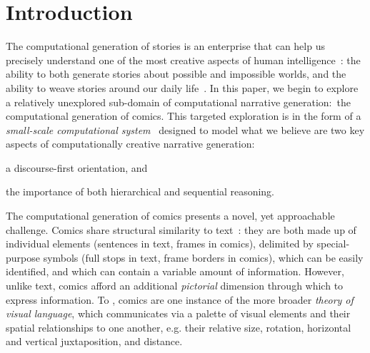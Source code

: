 \section{Introduction}

The computational generation of stories is an enterprise that can help us
precisely understand one of the most creative aspects of human
intelligence~\cite{boyd2009origin}: the ability to both generate stories about
possible and impossible worlds, and the ability to weave stories around our
daily life~\cite{herman2013storytelling}. In this paper, we begin to explore a
relatively unexplored sub-domain of computational narrative generation:~the
computational generation of comics. This targeted exploration is in the form of
a \emph{small-scale computational system}~\cite{montfort2012small} designed to
model what we believe are two key aspects of computationally creative narrative
generation:
%
\begin{inparaenum}[]
	\item a discourse-first orientation, and
	\item the importance of both hierarchical and sequential reasoning.
\end{inparaenum}


The computational generation of comics presents a novel, yet approachable
challenge. Comics share structural similarity to
text~\cite{saraceni2016relatedness}: they are both made up of individual
elements (sentences in text, frames in comics), delimited by special-purpose
symbols (full stops in text, frame borders in comics), which can be easily
identified, and which can contain a variable amount of information. However,
unlike text, comics afford an additional \emph{pictorial} dimension through
which to express information. To , comics are one instance
of the more broader \emph{theory of visual language}, which communicates via a
palette of visual elements and their spatial relationships to one another, e.g.
their relative size, rotation, horizontal and vertical juxtaposition, and
distance. 

















